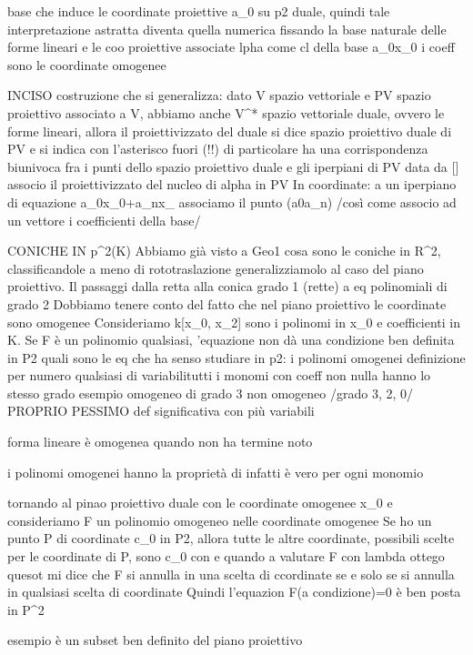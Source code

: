 base che induce le coordinate proiettive a_0   su p2 duale, quindi tale interpretazione astratta diventa quella numerica fissando la base naturale delle forme lineari e le coo proiettive associate  lpha come cl della base a_0x_0   i coeff sono le coordinate omogenee

INCISO
costruzione che si generalizza: dato V spazio vettoriale e PV spazio  proiettivo associato a V, abbiamo anche V^* spazio vettoriale duale, ovvero le forme lineari, allora il proiettivizzato del duale si dice spazio proiettivo duale di PV e si indica con l'asterisco fuori (!!)
di particolare ha una corrispondenza biunivoca fra i punti dello spazio proiettivo duale e gli iperpiani di PV   data da [\alpha]  associo il proiettivizzato del nucleo di alpha in PV
In coordinate: a un iperpiano di equazione a_0x_0+a_nx_ associamo il punto (a0\colon   a_n)
/così come associo ad un vettore i coefficienti della base/


CONICHE IN p^2(K)
Abbiamo già visto a Geo1 cosa sono le coniche in R^2, classificandole a meno di rototraslazione
generalizziamolo al caso del piano proiettivo. Il passaggi dalla retta alla conica   grado 1 (rette) a eq polinomiali di grado 2 Dobbiamo tenere conto del fatto che nel piano proiettivo le coordinate sono omogenee
Consideriamo k[x_0,   x_2] sono i polinomi in x_0   e coefficienti in K. Se F è un polinomio qualsiasi, 'equazione non dà una condizione ben definita in P2
quali sono le eq che ha senso studiare in p2: i polinomi omogenei
definizione per numero qualsiasi di variabilitutti i monomi con coeff non nulla hanno lo stesso grado
esempio
omogeneo di grado 3
non omogeneo  /grado 3, 2, 0/   PROPRIO PESSIMO
def significativa con più variabili

forma lineare è omogenea quando non ha termine noto

i polinomi omogenei hanno la proprietà di 		 infatti è vero per ogni monomio


tornando al pinao proiettivo duale con le coordinate omogenee x_0   e consideriamo F un polinomio omogeneo nelle coordinate omogenee
Se ho un punto P di coordinate c_0   in P2, allora tutte le altre coordinate, possibili scelte per le coordinate di P, sono \lambda c_0   con \lambda\in\kamp\setminus    e quando a valutare F con lambda ottego     quesot mi dice che F si annulla in una scelta di ccordinate se e solo se si annulla in qualsiasi scelta di coordinate
Quindi l'equazion F(a condizione)=0 è ben posta in P^2

esempio
è un subset ben definito del piano proiettivo

